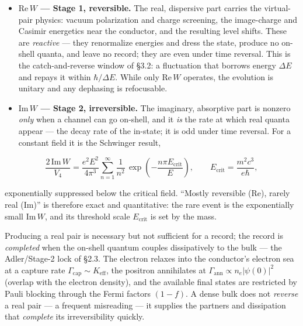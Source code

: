 \documentclass[
]{article}
\providecommand{\tightlist}{%
  \setlength{\itemsep}{0pt}\setlength{\parskip}{0pt}}
\begin{document}
\begin{itemize}
\tightlist
\item
  \textbf{\(\mathrm{Re}\,W\) --- Stage 1, reversible.} The real,
  dispersive part carries the virtual-pair physics: vacuum polarization
  and charge screening, the image-charge and Casimir energetics near the
  conductor, and the resulting level shifts. These are \emph{reactive}
  --- they renormalize energies and dress the state, produce no on-shell
  quanta, and leave no record; they are even under time reversal. This
  is the catch-and-reverse window of §3.2: a fluctuation that borrows
  energy \(\Delta E\) and repays it within \(\hbar/\Delta E\). While
  only \(\mathrm{Re}\,W\) operates, the evolution is unitary and any
  dephasing is refocusable.
\item
  \textbf{\(\mathrm{Im}\,W\) --- Stage 2, irreversible.} The imaginary,
  absorptive part is nonzero \emph{only} when a channel can go on-shell,
  and it \emph{is} the rate at which real quanta appear --- the decay
  rate of the in-state; it is odd under time reversal. For a constant
  field it is the Schwinger result,
\end{itemize}

\[\frac{2\,\mathrm{Im}\,W}{V_4} = \frac{e^2E^2}{4\pi^3}\sum_{n=1}^{\infty}\frac{1}{n^2}\,\exp\!\left(-\frac{n\pi E_{\text{crit}}}{E}\right),\qquad E_{\text{crit}}=\frac{m^2c^3}{e\hbar},\]

exponentially suppressed below the critical field. ``Mostly reversible
(\(\mathrm{Re}\)), rarely real (\(\mathrm{Im}\))'' is therefore exact
and quantitative: the rare event is the exponentially small
\(\mathrm{Im}\,W\), and its threshold scale \(E_{\text{crit}}\) is set
by the mass.

Producing a real pair is necessary but not sufficient for a record; the
record is \emph{completed} when the on-shell quantum couples
dissipatively to the bulk --- the Adler/Stage-2 lock of §2.3. The
electron relaxes into the conductor's electron sea at a capture rate
\(\Gamma_{\text{cap}}\sim K_{\text{eff}}\), the positron annihilates at
\(\Gamma_{\text{ann}}\propto n_e|\psi(0)|^2\) (overlap with the electron
density), and the available final states are restricted by Pauli
blocking through the Fermi factors \((1-f)\). A dense bulk does not
\emph{reverse} a real pair --- a frequent misreading --- it supplies the
partners and dissipation that \emph{complete} its irreversibility
quickly.
\end{document}
